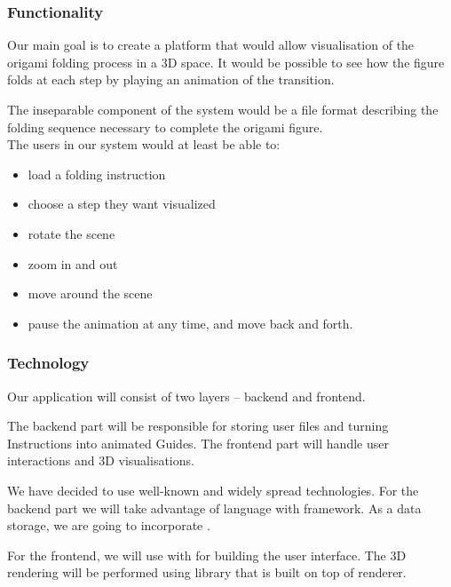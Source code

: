 \subsubsection{Functionality}

Our main goal is to create a platform that would allow visualisation of the origami folding process in a 3D space.
It would be possible to see how the figure folds at each step by playing an animation of the transition.

The inseparable component of the system would be a file format describing the folding sequence necessary to complete the origami figure.\\

The users in our system would at least be able to:
\begin{itemize}
	\item load a folding instruction
	\item choose a step they want visualized
	\item rotate the scene
    \item zoom in and out
	\item move around the scene
	\item pause the animation at any time, and move back and forth.
\end{itemize}

\subsubsection{Technology}

Our application will consist of two layers -- backend and frontend.

The backend part will be responsible for storing user files and turning Instructions into animated Guides.
The frontend part will handle user interactions and 3D visualisations.

We have decided to use well-known and widely spread technologies.
For the backend part we will take advantage of  language with  framework.
As a data storage, we are going to incorporate .

For the frontend, we will use  with  for building the user interface.
The 3D rendering will be performed using  library that is built on top of  renderer.

